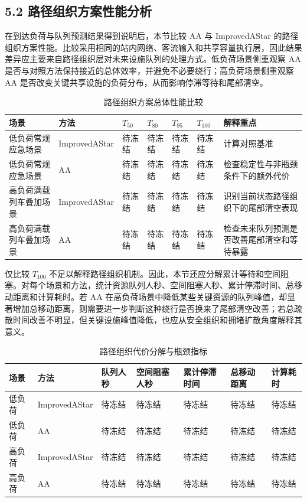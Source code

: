 \documentclass[UTF8,a4paper,12pt]{ctexart}
\begin{document}
\subsection{5.2 路径组织方案性能分析}

在到达负荷与队列预测结果得到说明后，本节比较 AA 与 ImprovedAStar 的路径组织方案性能。比较采用相同的站内网络、客流输入和共享容量执行层，因此结果差异应主要来自路径组织层对未来设施队列的处理方式。低负荷场景侧重观察 AA 是否与对照方法保持接近的总体效率，并避免不必要绕行；高负荷场景侧重观察 AA 是否改变关键共享设施的负荷分布，从而影响停滞等待和尾部清空。

\begin{table}[htbp]
\centering
\caption{路径组织方案总体性能比较}
\small
\begin{tabular}{p{}p{}p{}p{}p{}p{}p{}}
\toprule
场景 & 方法 & \(T_{50}\) & \(T_{80}\) & \(T_{95}\) & \(T_{100}\) & 解释重点 \\
\midrule
低负荷常规应急场景 & ImprovedAStar & 待冻结 & 待冻结 & 待冻结 & 待冻结 & 计算对照基准 \\
低负荷常规应急场景 & AA & 待冻结 & 待冻结 & 待冻结 & 待冻结 & 检查稳定性与非瓶颈条件下的额外代价 \\
高负荷满载列车叠加场景 & ImprovedAStar & 待冻结 & 待冻结 & 待冻结 & 待冻结 & 识别当前状态路径组织下的尾部清空表现 \\
高负荷满载列车叠加场景 & AA & 待冻结 & 待冻结 & 待冻结 & 待冻结 & 检查未来队列预测是否改善尾部清空和等待暴露 \\
\bottomrule
\end{tabular}
\end{table}

仅比较 \(T_{100}\) 不足以解释路径组织机制。因此，本节还应分解累计等待和空间阻塞。对每个场景和方法，统计资源队列人秒、空间阻塞人秒、累计停滞时间、总移动距离和计算耗时。若 AA 在高负荷场景中降低某些关键资源的队列峰值，却显著增加总移动距离，则需要进一步判断这种绕行是否换来了尾部清空改善；若总疏散时间改善不明显，但关键设施峰值降低，也应从安全组织和拥堵扩散角度解释其意义。

\begin{table}[htbp]
\centering
\caption{路径组织代价分解与瓶颈指标}
\small
\begin{tabular}{p{}p{}p{}p{}p{}p{}p{}}
\toprule
场景 & 方法 & 队列人秒 & 空间阻塞人秒 & 累计停滞时间 & 总移动距离 & 计算耗时 \\
\midrule
低负荷 & ImprovedAStar & 待冻结 & 待冻结 & 待冻结 & 待冻结 & 待冻结 \\
低负荷 & AA & 待冻结 & 待冻结 & 待冻结 & 待冻结 & 待冻结 \\
高负荷 & ImprovedAStar & 待冻结 & 待冻结 & 待冻结 & 待冻结 & 待冻结 \\
高负荷 & AA & 待冻结 & 待冻结 & 待冻结 & 待冻结 & 待冻结 \\
\bottomrule
\end{tabular}
\end{table}
\end{document}
